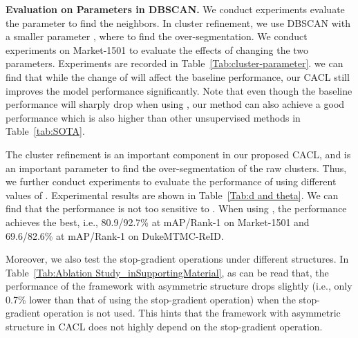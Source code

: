 \documentclass[journal]{IEEEtran}
\def\ie{i.e.}
\newcommand{\myparagraph}[1]{\noindent\textbf{#1.}}
\begin{document}
\myparagraph{Evaluation on Parameters in DBSCAN} We conduct experiments 
evaluate the parameter  to find the neighbors. In cluster refinement, we use DBSCAN with a smaller parameter , where  to find the over-segmentation. 
We conduct experiments on Market-1501 to evaluate the effects of changing the two parameters.
Experiments are recorded in Table~\ref{Tab:cluster-parameter}. we can find
that while the change of  will affect the baseline performance, our CACL  still improves the model performance significantly. Note that even though the baseline performance will sharply drop when using , our method can also achieve a good performance which is also higher than other unsupervised methods in Table~\ref{tab:SOTA}.



The cluster refinement is  an important component in our proposed CACL, and  is an important parameter to find the over-segmentation of the raw clusters. Thus, we further conduct experiments to evaluate the performance of using different values of . Experimental results are shown in 
Table~\ref{Tab:d and theta}. We can find that the performance is not too sensitive to . 
When using  , the performance achieves the best, \ie,  80.9/92.7\% at mAP/Rank-1 on Market-1501 and 69.6/82.6\% at mAP/Rank-1 on DukeMTMC-ReID.



Moreover, we also test the stop-gradient operations under different structures. In Table~\ref{Tab:Ablation Study_inSupportingMaterial}, 
as can be read that, the performance of the framework with asymmetric structure drops slightly (\ie, only 0.7\% lower than that of using the stop-gradient operation) when the stop-gradient operation is not used. This hints that the framework with asymmetric structure in CACL does not highly depend on the stop-gradient operation.
\end{document}
